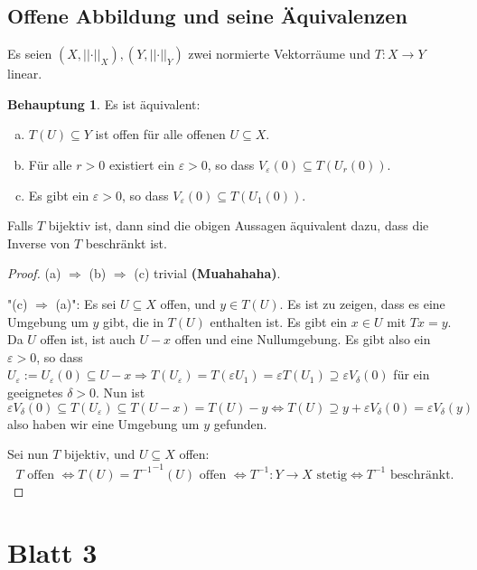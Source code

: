 \documentclass[ngerman]{article}
\theoremstyle{definition}%
\newtheorem*{beh}{Behauptung}
\newcommand{\norm}[1]{\left\lvert \left\lvert #1 \right\rvert \right\rvert}
\newcommand{\df}{\Rightarrow} %
\newcommand{\afs}{"{}}
\renewcommand{\{ }{\left\lbrace}
\renewcommand{\}}{\right\rbrace}
\begin{document}
\subsection{Offene Abbildung und seine Äquivalenzen}
Es seien $(X,\norm{\cdot}_X),(Y,\norm{\cdot}_Y)$ zwei normierte Vektorräume und $T:X\to Y$ linear.
\begin{beh}
Es ist äquivalent:
\begin{enumerate}[(a)]
	\item $T(U) \subseteq Y$ ist offen für alle offenen $U\subseteq X$.
	\item Für alle $r>0$ existiert ein $\varepsilon>0$, so dass $V_\varepsilon(0) \subseteq T(U_r(0)).$
	\item Es gibt ein $\varepsilon > 0$, so dass $V_\varepsilon(0) \subseteq T(U_1(0))$.
\end{enumerate}
Falls $T$ bijektiv ist, dann sind die obigen Aussagen äquivalent dazu, dass die Inverse von $T$ beschränkt ist.
\end{beh}

\begin{proof}
	(a) $\df$ (b) $\df$ (c) trivial \textbf{(Muahahaha)}.\par 
 	\afs (c) $\df$ (a)\afs : Es sei $U\subseteq X$ offen, und $y \in T(U)$. Es ist zu zeigen, dass es eine Umgebung um $y$ gibt, die in $T(U)$ enthalten ist. Es gibt ein $x \in U$ mit $Tx = y$. Da $U$ offen ist, ist auch $U - x$ offen und eine Nullumgebung. Es gibt also ein $\varepsilon>0$, so dass $U_\varepsilon := U_\varepsilon(0) \subseteq U - x \df T(U_\varepsilon) = T(\varepsilon U_1) = \varepsilon T(U_1) \supseteq \varepsilon V_\delta (0)$ für ein geeignetes $\delta > 0$. Nun ist 
 	$$\varepsilon V_\delta(0) \subseteq T(U_\varepsilon) \subseteq T(U-x) = T(U) - y \Leftrightarrow T(U) \supseteq y + \varepsilon V_\delta(0)  = \varepsilon V_\delta(y)$$
 	also haben wir eine Umgebung um $y$ gefunden.\par
	Sei nun $T$ bijektiv, und $U \subseteq X$ offen: 
	$$ T \text{ offen } \Leftrightarrow T(U) = {T^{-1}}^{-1}(U) \text{ offen } \Leftrightarrow T^{-1}:Y\to X \text{ stetig} \Leftrightarrow T^{-1} \text{ beschränkt.}$$	
\end{proof}


\newpage
\section{Blatt 3}
\end{document}
